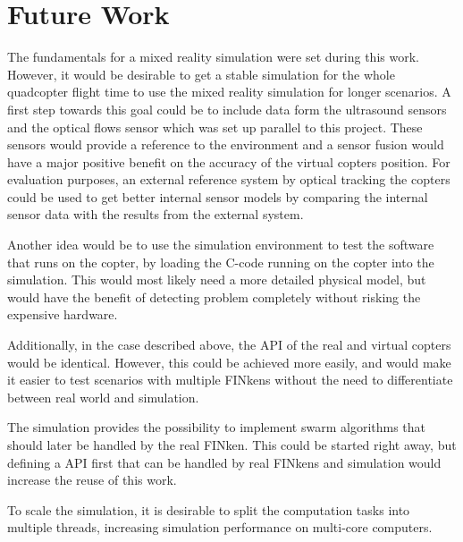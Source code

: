 \section{Future Work}
\label{sec:future}
The fundamentals for a mixed reality simulation were set during this work.
However, it would be desirable to get a stable simulation for the whole quadcopter flight time to use the mixed reality simulation for longer scenarios.
A first step towards this goal could be to include data form the ultrasound sensors and the optical flows sensor which was set up parallel to this project.
These sensors would provide a reference to the environment and a sensor fusion would have a major positive benefit on the accuracy of the virtual copters position.
For evaluation purposes, an external reference system by optical tracking the copters could be used to get better internal sensor models by comparing the internal sensor data with the results from the external system.

Another idea would be to use the simulation environment to test the software that runs on the copter, by loading the C-code running on the copter into the simulation.
This would most likely need a more detailed physical model, but would have the benefit of detecting problem completely without risking the expensive hardware.

Additionally, in the case described above, the API of the real and virtual copters would be identical. 
However, this could be achieved more easily, and would make it easier to test scenarios with multiple FINkens without the need to differentiate between real world and simulation.


The simulation  provides the possibility to implement swarm algorithms that should later be handled by the real FINken.
This could be started right away, but defining a API first that can be handled by real FINkens and simulation would increase the reuse of this work.

To scale the simulation, it is desirable to split the computation tasks into multiple threads, increasing simulation performance on multi-core computers.






